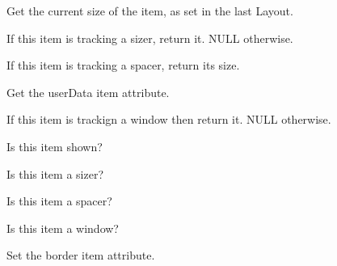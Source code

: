 Get the current size of the item, as set in the last Layout.

\label{wxsizeritemgetsizer}


If this item is tracking a sizer, return it.  NULL otherwise.


\label{wxsizeritemgetspacer}


If this item is tracking a spacer, return its size.


\label{wxsizeritemgetuserdata}


Get the userData item attribute.


\label{wxsizeritemgetwindow}


If this item is trackign a window then return it.  NULL otherwise.

\label{wxsizeritemisshown}


Is this item shown?


\label{wxsizeritemissizer}


Is this item a sizer?


\label{wxsizeritemisspacer}


Is this item a spacer?


\label{wxsizeritemiswindow}


Is this item a window?


\label{wxsizeritemsetborder}


Set the border item attribute.

\label{wxsizeritemsetdimension}

